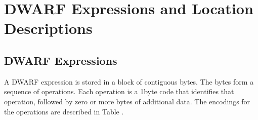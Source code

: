 \section{DWARF Expressions and Location Descriptions}
\label{datarep:dwarfexpressionsandlocationdescriptions}
\subsection{DWARF Expressions}
\label{datarep:dwarfexpressions}

A DWARF expression is stored in a block of contiguous
bytes. The bytes form a sequence of operations. Each operation
is a 1\dash byte code that identifies that operation, followed by
zero or more bytes of additional data. The encodings for the
operations are described in 
Table . 

